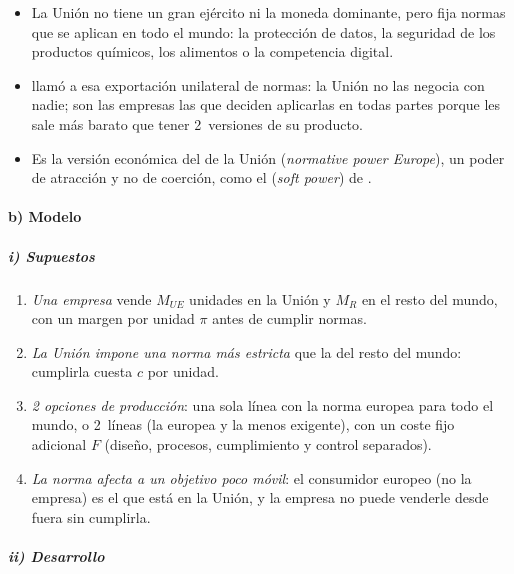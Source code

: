 \documentclass[11pt]{article}
\begin{document}
\begin{itemize}
\item La Unión no tiene un gran ejército ni la moneda dominante, pero fija normas que se aplican en todo el mundo: la protección de datos, la seguridad de los productos químicos, los alimentos o la competencia digital.
\item \textcite{Bradford2012Brussels} llamó  a esa exportación unilateral de normas: la Unión no las negocia con nadie; son las empresas las que deciden aplicarlas en todas partes porque les sale más barato que tener 2~versiones de su producto\nocite{Bradford2020Brussels}.
\item Es la versión económica del  de la Unión (\emph{normative power Europe}), un poder de atracción y no de coerción, como el  (\emph{soft power}) de \textcite{Nye2004Soft}\nocite{Manners2002Normative}.
\end{itemize}

\paragraph{b) Modelo}

\subparagraph{i) Supuestos}

\begin{enumerate}
\item \emph{Una empresa} vende $M_{UE}$ unidades en la Unión y $M_R$ en el resto del mundo, con un margen por unidad $\pi$ antes de cumplir normas.
\item \emph{La Unión impone una norma más estricta} que la del resto del mundo: cumplirla cuesta $c$ por unidad.
\item \emph{2 opciones de producción}: una sola línea con la norma europea para todo el mundo, o 2~líneas (la europea y la menos exigente), con un coste fijo adicional $F$ (diseño, procesos, cumplimiento y control separados).
\item \emph{La norma afecta a un objetivo poco móvil}: el consumidor europeo (no la empresa) es el que está en la Unión, y la empresa no puede venderle desde fuera sin cumplirla.
\end{enumerate}

\subparagraph{ii) Desarrollo}
\end{document}
